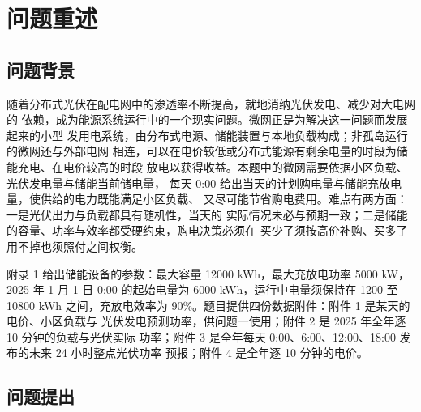 \documentclass[withoutpreface]{cumcmthesis}
\begin{document}
\begin{abstract}
本文的创新点在于：（1）以\textbf{低需求日分组}构造情景集：由暖机期日均净负荷推出
低需求日、取同组历史日，全程无前视，显著优于按星期取样与不分组；（2）把附件 3 的
整点预报按“整点时刻值”的原义\textbf{线性插值}到 10 分钟粒度，正午净需求预报误差由
分段常数的 867 kW 降至 \textbf{524 kW}；（3）针对不同调整时窗分别确定计划购电量的分位水平，并通过数值扫描确定其参数，并给出该分位只能扫描、不能由静态报童临界比推出的实测证据；（4）通过
\textbf{可交付充电下确界}保证规划层与执行层的储能状态一致。

\textbf{关键词}：微网购电策略\quad 分位数决策\quad 两阶段随机优化\quad 储能调度
\end{abstract}

\section{问题重述}

\subsection{问题背景}

随着分布式光伏在配电网中的渗透率不断提高，就地消纳光伏发电、减少对大电网的
依赖，成为能源系统运行中的一个现实问题。微网正是为解决这一问题而发展起来的小型
发用电系统，由分布式电源、储能装置与本地负载构成；非孤岛运行的微网还与外部电网
相连，可以在电价较低或分布式能源有剩余电量的时段为储能充电、在电价较高的时段
放电以获得收益。本题中的微网需要依据小区负载、光伏发电量与储能当前储电量，
每天 0:00 给出当天的计划购电量与储能充放电量，使供给的电力既能满足小区负载、
又尽可能节省购电费用。难点有两方面：一是光伏出力与负载都具有随机性，当天的
实际情况未必与预期一致；二是储能的容量、功率与效率都受硬约束，购电决策必须在
买少了须按高价补购、买多了用不掉也须照付之间权衡。

附录 1 给出储能设备的参数：最大容量 12000 kWh，最大充放电功率 5000 kW，
2025 年 1 月 1 日 0:00 的起始电量为 6000 kWh，运行中电量须保持在 1200 至 10800 kWh
之间，充放电效率为 90\%。题目提供四份数据附件：附件 1 是某天的电价、小区负载与
光伏发电预测功率，供问题一使用；附件 2 是 2025 年全年逐 10 分钟的负载与光伏实际
功率；附件 3 是全年每天 0:00、6:00、12:00、18:00 发布的未来 24 小时整点光伏功率
预报；附件 4 是全年逐 10 分钟的电价。

\subsection{问题提出}
\end{document}
